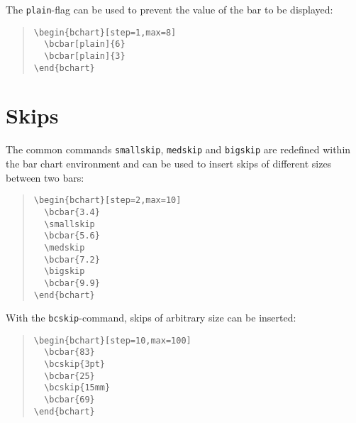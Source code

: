 \documentclass{article}
\begin{document}
The \texttt{plain}-flag can be used to prevent the value of the bar to be displayed:
\begin{quote}\small
\begin{verbatim}
\begin{bchart}[step=1,max=8]
  \bcbar[plain]{6}
  \bcbar[plain]{3}
\end{bchart}
\end{verbatim}
\end{quote}
\begin{quote}
\begin{bchart}[step=1,max=8]
\end{bchart}
\end{quote}


\section{Skips}

The common commands \texttt{smallskip}, \texttt{medskip} and \texttt{bigskip} are redefined within the bar chart environment and can be used to insert skips of different sizes between two bars:
\begin{quote}\small
\begin{verbatim}
\begin{bchart}[step=2,max=10]
  \bcbar{3.4}
  \smallskip
  \bcbar{5.6}
  \medskip
  \bcbar{7.2}
  \bigskip
  \bcbar{9.9}
\end{bchart}
\end{verbatim}
\end{quote}
\begin{quote}
\begin{bchart}[step=2,max=10]
  \smallskip
  \medskip
  \bigskip
\end{bchart}
\end{quote}
With the \texttt{bcskip}-command, skips of arbitrary size can be inserted:
\begin{quote}\small
\begin{verbatim}
\begin{bchart}[step=10,max=100]
  \bcbar{83}
  \bcskip{3pt}
  \bcbar{25}
  \bcskip{15mm}
  \bcbar{69}
\end{bchart}
\end{verbatim}
\end{quote}
\begin{quote}
\begin{bchart}[step=10,max=100]
  \bcskip{3pt}
  \bcskip{15mm}
\end{bchart}
\end{quote}
\end{document}
